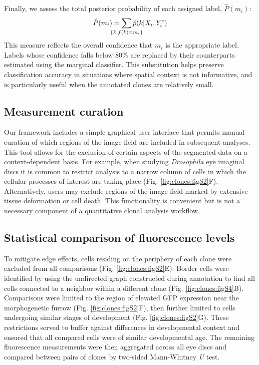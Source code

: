 Finally, we assess the total posterior probability of each assigned label, $\hat{P}(m_i)$:
\begin{equation}
\hat{P}(m_i) = \sum_{ \mathclap{ \{ k | f(k)=m_i \}} } \hat{p}(k | X_i,Y^c_i)
\end{equation}
This measure reflects the overall confidence that $m_i$ is the appropriate label. Labels whose confidence falls below 80\% are replaced by their counterparts estimated using the marginal classifier. This substitution helps preserve classification accuracy in situations where spatial context is not informative, and is particularly useful when the annotated clones are relatively small.

\subsection{Measurement curation}
\label{appendix:methods:clones:curation}

Our framework includes a simple graphical user interface that permits manual curation of which regions of the image field are included in subsequent analyses. This tool allows for the exclusion of certain aspects of the segmented data on a context-dependent basis. For example, when studying \textit{Drosophila} eye imaginal discs it is common to restrict analysis to a narrow column of cells in which the cellular processes of interest are taking place (Fig. \ref{fig:clones:figS2}F). Alternatively, users may exclude regions of the image field marked by extensive tissue deformation or cell death. This functionality is convenient but is not a necessary component of a quantitative clonal analysis workflow.

\subsection{Statistical comparison of fluorescence levels}
\label{appendix:methods:clones:comparison}

To mitigate edge effects, cells residing on the periphery of each clone were excluded from all comparisons (Fig. \ref{fig:clones:figS2}E). Border cells were identified by using the undirected graph constructed during annotation to find all cells connected to a neighbor within a different clone (Fig. \ref{fig:clones:figS4}B). Comparisons were limited to the region of elevated GFP expression near the morphogenetic furrow (Fig. \ref{fig:clones:figS2}F), then further limited to cells undergoing similar stages of development (Fig. \ref{fig:clones:figS2}G). These restrictions served to buffer against differences in developmental context and ensured that all compared cells were of similar developmental age. The remaining fluorescence measurements were then aggregated across all eye discs and compared between pairs of clones by two-sided Mann-Whitney \textit{U} test.

